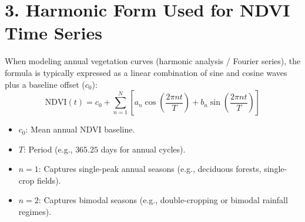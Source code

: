 \documentclass[11pt,a4paper]{article}
\begin{document}
\section*{3. Harmonic Form Used for NDVI Time Series}
When modeling annual vegetation curves (harmonic analysis / Fourier series), the formula is typically expressed as a linear combination of sine and cosine waves plus a baseline offset ($c_0$):
\begin{equation}
\mathrm{NDVI}(t) = c_0 + \sum_{n=1}^{N} \left[ a_n \cos\left(\frac{2\pi n t}{T}\right) + b_n \sin\left(\frac{2\pi n t}{T}\right) \right]
\end{equation}

\begin{itemize}[leftmargin=1.5em]
    \item $c_0$: Mean annual NDVI baseline.
    \item $T$: Period (e.g., $365.25$ days for annual cycles).
    \item $n = 1$: Captures single-peak annual seasons (e.g., deciduous forests, single-crop fields).
    \item $n = 2$: Captures bimodal seasons (e.g., double-cropping or bimodal rainfall regimes).
\end{itemize}
\end{document}
